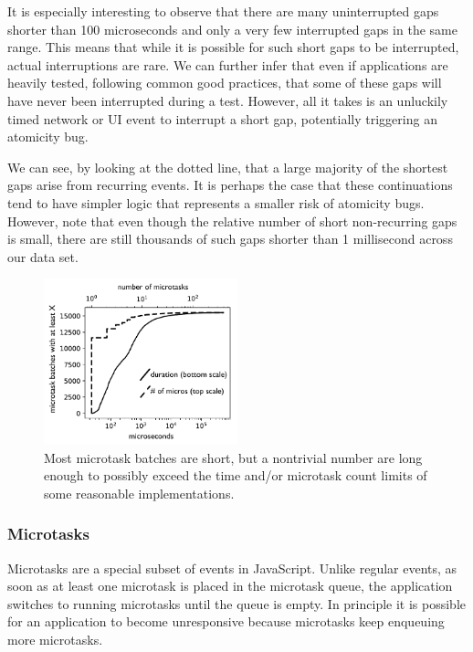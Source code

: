 \documentclass[sigplan,10pt,review,anonymous]{acmart}\settopmatter{printfolios=true,printccs=false,printacmref=false}
\begin{document}
It is especially interesting to observe that there are many uninterrupted gaps shorter than 100 microseconds and only a very few interrupted gaps in the same range.
This means that while it is possible for such short gaps to be interrupted, actual interruptions are rare.
We can further infer that even if applications are heavily tested, following common good practices, that some of these gaps will have never been interrupted during a test.
However, all it takes is an unluckily timed network or UI event to interrupt a short gap, potentially triggering an atomicity bug.

We can see, by looking at the dotted line, that a large majority of the shortest gaps arise from recurring events.
It is perhaps the case that these continuations tend to have simpler logic that represents a smaller risk of atomicity bugs.
However, note that even though the relative number of short non-recurring gaps is small, there are still thousands of such gaps shorter than 1 millisecond across our data set.

\begin{figure}
\hspace*{-0.2cm}\includegraphics[width=0.5\textwidth]{micros_graph_bw}
\caption{Most microtask batches are short, but a nontrivial number are long enough to possibly exceed the time and/or microtask count limits of some reasonable implementations.}
\label{fig:graph_microtasks}
\end{figure}

\subsubsection{Microtasks}

Microtasks are a special subset of events in JavaScript.
Unlike regular events, as soon as at least one microtask is placed in the microtask queue, the application switches to running microtasks until the queue is empty.
In principle it is possible for an application to become unresponsive because microtasks keep enqueuing more microtasks.
\end{document}
